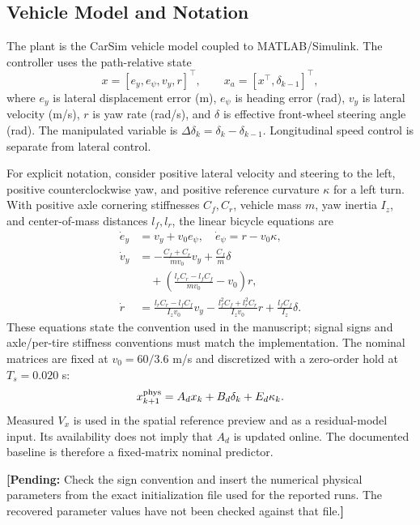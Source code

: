 \documentclass[10pt,journal]{IEEEtran}
\newcommand{\pending}[1]{\par\smallskip\noindent\textbf{[Pending:} #1\textbf{]}\par\smallskip}
\begin{document}
\subsection{Vehicle Model and Notation}
The plant is the CarSim vehicle model coupled to MATLAB/Simulink. The controller uses the path-relative state
\begin{equation}
 x=[e_y,e_\psi,v_y,r]^\top,\qquad
 x_a=[x^\top,\delta_{k-1}]^\top,
\end{equation}
where $e_y$ is lateral displacement error (m), $e_\psi$ is heading error (rad), $v_y$ is lateral velocity (m/s), $r$ is yaw rate (rad/s), and $\delta$ is effective front-wheel steering angle (rad). The manipulated variable is $\Delta\delta_k=\delta_k-\delta_{k-1}$. Longitudinal speed control is separate from lateral control.

For explicit notation, consider positive lateral velocity and steering to the left, positive counterclockwise yaw, and positive reference curvature $\kappa$ for a left turn. With positive axle cornering stiffnesses $C_f,C_r$, vehicle mass $m$, yaw inertia $I_z$, and center-of-mass distances $l_f,l_r$, the linear bicycle equations are
\begin{align}
 \dot e_y&=v_y+v_0e_\psi,\quad \dot e_\psi=r-v_0\kappa,\label{eq:errors}\\
 \dot v_y&=-\frac{C_f+C_r}{mv_0}v_y
 +\frac{C_f}{m}\delta\nonumber\\
 &\quad +\left(\frac{l_rC_r-l_fC_f}{mv_0}-v_0\right)r,\label{eq:vy}\\
 \dot r&=\frac{l_rC_r-l_fC_f}{I_zv_0}v_y
 -\frac{l_f^2C_f+l_r^2C_r}{I_zv_0}r
 +\frac{l_fC_f}{I_z}\delta.\label{eq:r}
\end{align}
These equations state the convention used in the manuscript; signal signs and axle/per-tire stiffness conventions must match the implementation. The nominal matrices are fixed at $v_0=60/3.6$ m/s and discretized with a zero-order hold at $T_s=0.020$ s:
\begin{equation}
 x_{k+1}^{\rm phys}=A_dx_k+B_d\delta_k+E_d\kappa_k.\label{eq:physical}
\end{equation}
Measured $V_x$ is used in the spatial reference preview and as a residual-model input. Its availability does not imply that $A_d$ is updated online. The documented baseline is therefore a fixed-matrix nominal predictor.
\pending{Check the sign convention and insert the numerical physical parameters from the exact initialization file used for the reported runs. The recovered parameter values have not been checked against that file.}
\end{document}
